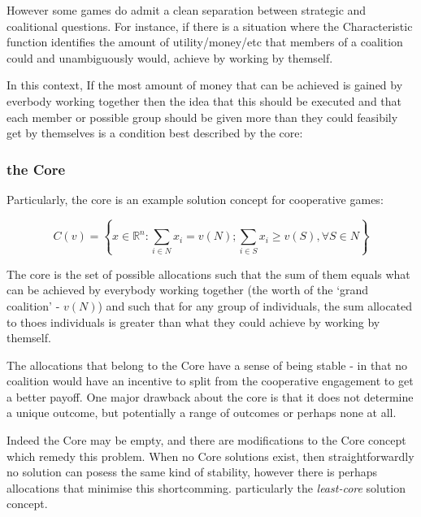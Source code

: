 However some games do admit a clean separation between strategic and coalitional questions.
For instance, if there is a situation where the Characteristic function identifies the amount of utility/money/etc that members of a coalition could and unambiguously would, achieve by working by themself.

In this context, If the most amount of money that can be achieved is gained by everbody working together then the idea that this should be executed and that each member or possible group should be given more than they could feasibily get by themselves is a condition best described by the core:

\subsubsection{the Core}

Particularly, the core is an example solution concept for cooperative games:

$$ C(v) = \left\{x\in\mathbb{R}^n : \sum_{i\in N}x_i=v(N); \sum_{i\in S}x_i \ge v(S), \forall S\in N \right\}$$

The core is the set of possible allocations such that the sum of them equals what can be achieved by everybody working together (the worth of the `grand coalition' - $v(N)$) and such that for any group of individuals, the sum allocated to thoes individuals is greater than what they could achieve by working by themself.

The allocations that belong to the Core have a sense of being stable - in that no coalition would have an incentive to split from the cooperative engagement to get a better payoff. One major drawback about the core is that it does not determine a unique outcome, but potentially a range of outcomes or perhaps none at all.

Indeed the Core may be empty, and there are modifications to the Core concept which remedy this problem.
When no Core solutions exist, then straightforwardly no solution can posess the same kind of stability, however there is perhaps allocations that minimise this shortcomming.
particularly the \textit{least-core} solution concept.

